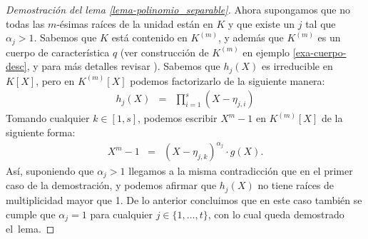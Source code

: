 \begin{proof}[Demostración del lema \ref{lema-polinomio_separable}]
	Ahora supongamos que no todas las $m$-ésimas raíces de la unidad están en $K$ y que existe un $j$ tal que $\alpha_j>1$. Sabemos que $K$ está contenido en $K^{(m)}$, y además que $K^{(m)}$ es un cuerpo de característica $q$ (ver construcción de $K^{(m)}$ en ejemplo \ref{exa-cuerpo-desc}, y para más detalles revisar \cite{AlgebraLang}).
        Sabemos que $h_j(X)$ es irreducible en $K[X]$, pero en $K^{(m)}[X]$ podemos factorizarlo de la siguiente manera:
		\begin{eqnarray*}
			h_j(X) & = &\prod_{i=1}^{s} (X-\eta_{j,i})
		\end{eqnarray*}
Tomando cualquier $k\in [1,s]$, podemos escribir $X^m - 1$ en
$K^{(m)}[X]$ de la siguiente forma:
\begin{eqnarray*}
	X^m-1 &=& (X-\eta_{j,k})^{\alpha_j}\cdot g(X).
\end{eqnarray*}
Así, suponiendo que $\alpha_j >1$ llegamos a la misma contradicción
que en el primer caso de la demostración, y podemos afirmar que
$h_j(X)$ no tiene raíces de multiplicidad mayor que 1. De lo anterior
concluimos que en este caso también se cumple que $\alpha_j=1$ para
cualquier $j\in \{1,...,t\}$, con lo cual queda demostrado el~lema.
\end{proof}  


